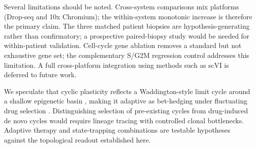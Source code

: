 Several limitations should be noted. Cross-system comparisons mix
platforms (Drop-seq and 10x Chromium); the within-system monotonic
increase is therefore the primary claim. The three matched patient
biopsies are hypothesis-generating rather than confirmatory; a
prospective paired-biopsy study would be needed for within-patient
validation. Cell-cycle gene ablation removes a standard but not
exhaustive gene set; the complementary S/G2M regression control
addresses this limitation. A full cross-platform integration using
methods such as scVI \citep{lopez2018} is deferred to future work.

We speculate that cyclic plasticity reflects a Waddington-style limit
cycle around a shallow epigenetic basin \citep{huang2012,pisco2015},
making it adaptive as bet-hedging under fluctuating drug selection
\citep{brock2009,gupta2011}. Distinguishing selection of pre-existing
cycles from drug-induced de novo cycles would require lineage tracing
with controlled clonal bottlenecks. Adaptive therapy and state-trapping
combinations are testable hypotheses against the topological readout
established here.
